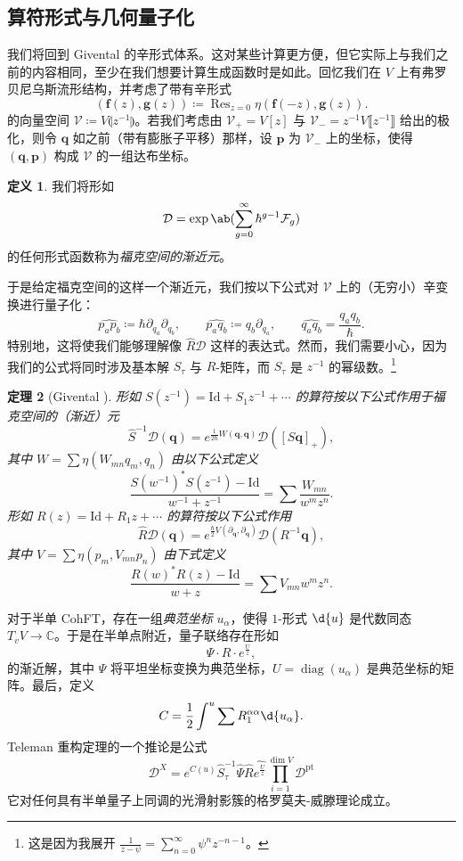 \documentclass{amsart}
\newtheorem{thm}{定理}[section]
\theoremstyle{definition}
\newtheorem{defn}[thm]{定义}
\theoremstyle{remark}
\theoremstyle{plain}
\theoremstyle{definition}
\theoremstyle{remark}
\newcommand{\C}{\mathbb{C}}
\newcommand{\mc}[1]{\mathcal{#1}}
\newcommand{\mbf}[1]{\mathbf{#1}}
\newcommand{\bq}{\mbf{q}}
\newcommand{\bp}{\mbf{p}}
\newcommand{\mr}[1]{\mathrm{#1}}
\newcommand{\on}[1]{\operatorname{#1}}
\newcommand{\wh}[1]{\widehat{#1}}
\newcommand{\1}{\mathbf{1}}
\newcommand{\2}{\mathbf{2}}
\newcommand{\3}{\mathbf{3}}
\newcommand{\ps}[1]{\llbracket #1 \rrbracket}
\newcommand{\ls}[1]{\llparenthesis #1 \rrparenthesis}
\begin{document}
\subsection{算符形式与几何量子化}%
\label{sub:Operator formalism and geometric quantization}

我们将回到 Givental 的辛形式体系。这对某些计算更方便，但它实际上与我们之前的内容相同，至少在我们想要计算生成函数时是如此。回忆我们在 $V$ 上有弗罗贝尼乌斯流形结构，并考虑了带有辛形式
\[ (\mbf{f}(z), \mbf{g}(z)) \coloneqq \on{Res}_{z=0} \eta(\mbf{f}(-z), \mbf{g}(z)). \]
的向量空间 $\mc{V}\coloneqq V\ls{z^{-1}}$。若我们考虑由 $\mc{V}_+ = V[z]$ 与 $\mc{V}_- = z^{-1}V\ps{z^{-1}}$ 给出的极化，则令 $\bq$ 如之前（带有膨胀子平移）那样，设 $\bp$ 为 $\mc{V}_-$ 上的坐标，使得 $(\bq, \bp)$ 构成 $\mc{V}$ 的一组达布坐标。

\begin{defn}
    我们将形如
    \[ \mc{D} = \exp\ab(\sum_{g=0}^{\infty} \hbar^{g-1} \mc{F}_g) \]
    的任何形式函数称为\textit{福克空间的渐近元}。
\end{defn}

于是给定福克空间的这样一个渐近元，我们按以下公式对 $\mc{V}$ 上的（无穷小）辛变换进行量子化：
\[ \wh{p_a p_b} \coloneqq \hbar \partial_{q_a} \partial_{q_b}, \qquad \wh{p_a q_b} \coloneqq q_b \partial_{q_a}, \qquad \wh{q_a q_b} = \frac{q_a q_b}{\hbar}. \]
特别地，这将使我们能够理解像 $\hat{R} \mc{D}$ 这样的表达式。然而，我们需要小心，因为我们的公式将同时涉及基本解 $S_{\tau}$ 与 $R$-矩阵，而 $S_{\tau}$ 是 $z^{-1}$ 的幂级数。\footnote{这是因为我展开 $\frac{1}{z-\psi} = \sum_{n=0}^{\infty} \psi^n z^{-n-1}$。}

\begin{thm}[Givental {\cite{Givental2001quantization}}]
    形如 $S(z^{-1}) = \mr{Id} + S_1 z^{-1} + \cdots$ 的算符按以下公式作用于福克空间的（渐近）元
    \[ \hat{S}^{-1} \mc{D}(\bq) = e^{\frac{1}{2\hbar}W(\bq,\bq)} \mc{D}([S \bq]_+), \]
    其中 $W = \sum \eta(W_{mn}q_m, q_n)$ 由以下公式定义
    \[ \frac{S(w^{-1})^* S(z^{-1}) - \mr{Id}}{w^{-1}+z^{-1}} = \sum \frac{W_{mn}}{w^m z^n}. \]
    形如 $R(z) = \mr{Id} + R_1 z + \cdots$ 的算符按以下公式作用
    \[ \hat{R}\mc{D}(\bq) = e^{\frac{\hbar}{2} V(\partial_{\bq}, \partial_{\bq})} \mc{D}(R^{-1} \bq), \]
    其中 $V = \sum \eta(p_m, V_{mn} p_n)$ 由下式定义
    \[ \frac{R(w)^* R(z) - \mr{Id}}{w+z} = \sum V_{mn} w^m z^n. \]
\end{thm}

对于半单 CohFT，存在一组\textit{典范坐标} $u_{\alpha}$，使得 $1$-形式 $\d{u}$ 是代数同态 $T_v V \to \C$。于是在半单点附近，量子联络存在形如
\[ \Psi \cdot  R \cdot e^{\frac{U}{z}}, \]
的渐近解，其中 $\Psi$ 将平坦坐标变换为典范坐标，$U = \on{diag}(u_{\alpha})$ 是典范坐标的矩阵。最后，定义
\[ C = \frac{1}{2} \int^u \sum R_1^{\alpha\alpha} \d{u_{\alpha}}. \]
Teleman 重构定理的一个推论是公式
\[ \mc{D}^X = e^{C(u)} \hat{S}^{-1}_{\tau} \hat{\Psi} \hat{R} \wh{e^{\frac{U}{z}}} \prod_{i=1}^{\dim V} \mc{D}^{\mr{pt}} \]
它对任何具有半单量子上同调的光滑射影簇的格罗莫夫-威滕理论成立。
\end{document}
